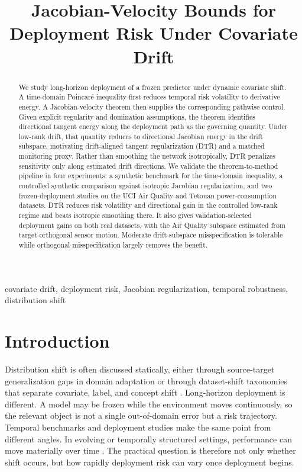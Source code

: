 \documentclass[conference]{IEEEtran}
\title{Jacobian-Velocity Bounds for Deployment Risk Under Covariate Drift}
\author{
\IEEEauthorblockN{Jonathan R. Landers}
\IEEEauthorblockA{
Independent Researcher\\
New York, NY, USA\\
\href{mailto:jonathan.robert.landers@gmail.com}{jonathan.robert.landers@gmail.com}
}
}
\begin{document}
\maketitle

\begin{abstract}
We study long-horizon deployment of a frozen predictor under dynamic covariate shift. A time-domain Poincar\'e inequality first reduces temporal risk volatility to derivative energy. A Jacobian-velocity theorem then supplies the corresponding pathwise control. Given explicit regularity and domination assumptions, the theorem identifies directional tangent energy along the deployment path as the governing quantity. Under low-rank drift, that quantity reduces to directional Jacobian energy in the drift subspace, motivating drift-aligned tangent regularization (DTR) and a matched monitoring proxy. Rather than smoothing the network isotropically, DTR penalizes sensitivity only along estimated drift directions. We validate the theorem-to-method pipeline in four experiments: a synthetic benchmark for the time-domain inequality, a controlled synthetic comparison against isotropic Jacobian regularization, and two frozen-deployment studies on the UCI Air Quality and Tetouan power-consumption datasets. DTR reduces risk volatility and directional gain in the controlled low-rank regime and beats isotropic smoothing there. It also gives validation-selected deployment gains on both real datasets, with the Air Quality subspace estimated from target-orthogonal sensor motion. Moderate drift-subspace misspecification is tolerable while orthogonal misspecification largely removes the benefit.
\end{abstract}

\begin{IEEEkeywords}
covariate drift, deployment risk, Jacobian regularization, temporal robustness, distribution shift
\end{IEEEkeywords}

\section{Introduction}
Distribution shift is often discussed statically, either through source-target generalization gaps in domain adaptation \cite{ben-david-shift} or through dataset-shift taxonomies that separate covariate, label, and concept shift \cite{moreno-shift}. Long-horizon deployment is different. A model may be frozen while the environment moves continuously, so the relevant object is not a single out-of-domain error but a risk trajectory. Temporal benchmarks and deployment studies make the same point from different angles. In evolving or temporally structured settings, performance can move materially over time \cite{gama-drift,koh-wilds,yao-wildtime,han-temporal}. The practical question is therefore not only whether shift occurs, but how rapidly deployment risk can vary once deployment begins.
\end{document}
